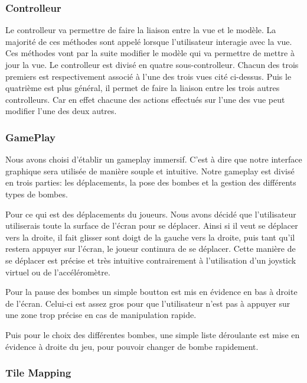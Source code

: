	
	
	\subsubsection{Controlleur}
	
	Le controlleur va permettre de faire la liaison entre la vue et le modèle. La majorité de ces méthodes sont appelé lorsque l'utilisateur interagie avec la vue. Ces méthodes vont par la suite modifier le modèle qui va permettre de mettre à jour la vue. Le controlleur est divisé en quatre sous-controlleur. Chacun des trois premiers est respectivement associé à l'une des trois vues cité ci-dessus. Puis le quatrième est plus général, il permet de faire la liaison entre les trois autres controlleurs. Car en effet chacune des actions effectués sur l'une des  vue peut modifier l'une des deux autres.
	
	\subsubsection{GamePlay}
	Nous avons choisi d'établir un gameplay immersif. C'est à dire que notre interface graphique sera utilisée de manière souple et intuitive. Notre gameplay est divisé en trois parties: les déplacements, la pose des bombes et la gestion des différents types de bombes.
		
		Pour ce qui est des déplacements du joueurs. Nous avons décidé que l'utilisateur utiliserais toute la surface de l'écran pour se déplacer. Ainsi si il veut se déplacer vers la droite, il fait glisser sont doigt de la gauche vers la droite, puis tant qu'il restera appuyer sur l'écran, le joueur continura de se déplacer. Cette manière de se déplacer est précise et très intuitive contrairement à l'utilisation d'un joystick virtuel ou de l'accéléromètre.
		
		Pour la pause des bombes un simple boutton est mis en évidence en bas à droite de l'écran. Celui-ci est assez gros pour que l'utilisateur n'est pas à appuyer sur une zone trop précise en cas de manipulation rapide.
		
		Puis pour le choix des différentes bombes, une simple liste déroulante est mise en évidence à droite du jeu, pour pouvoir changer de bombe rapidement.\\
		
		\subsubsection{Tile Mapping}

